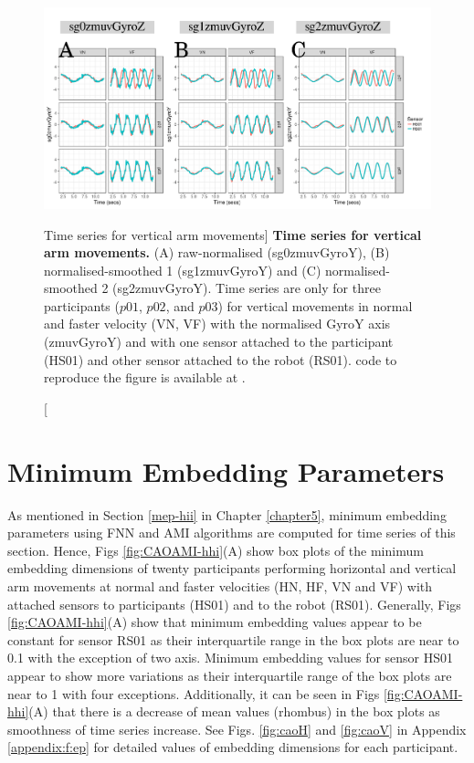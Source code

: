 \begin{figure}
  \centering
\includegraphics[width=1.0\textwidth]{fig_6_02}
	\caption
	[Time series for vertical arm movements]{
	{\bf Time series for vertical arm movements.}
		(A) raw-normalised (sg0zmuvGyroY), 
		(B) normalised-smoothed 1 (sg1zmuvGyroY) and
		(C) normalised-smoothed 2 (sg2zmuvGyroY).
		Time series are only for three participants 
		($p01$, $p02$, and $p03$) 
		for vertical movements in normal and faster velocity (VN, VF) 
		with the normalised GyroY axis (zmuvGyroY) 
		and with one sensor attached to the participant (HS01) 
		and other sensor attached to the robot (RS01).
	\R code to reproduce the figure is available at 
	.
        }
    \label{fig:tsV}
\end{figure}

\newpage
\section{Minimum Embedding Parameters}
As mentioned in Section \ref{mep-hii} in Chapter \ref{chapter5}, 
minimum embedding parameters using FNN and AMI algorithms 
are computed for time series of this section.
Hence, Figs \ref{fig:CAOAMI-hhi}(A) show box plots of the minimum embedding 
dimensions of twenty participants performing horizontal and vertical arm
movements at normal and faster velocities (HN, HF, VN and VF) with 
attached sensors to participants (HS01) and to the robot (RS01).
Generally, Figs \ref{fig:CAOAMI-hhi}(A) show that minimum embedding values 
appear to be constant for sensor RS01 as their interquartile range 
in the box plots are near to 0.1 with the exception of two axis. 
Minimum embedding values for sensor HS01 appear to show more variations 
as their interquartile range of the box plots are near to 1 
with four exceptions.
Additionally, it can be seen in Figs \ref{fig:CAOAMI-hhi}(A) that there is a 
decrease of mean values (rhombus) in the box plots
as smoothness of time series increase. 
See Figs. \ref{fig:caoH} and \ref{fig:caoV} in Appendix \ref{appendix:f:ep} 
for detailed values of embedding dimensions for each participant.

